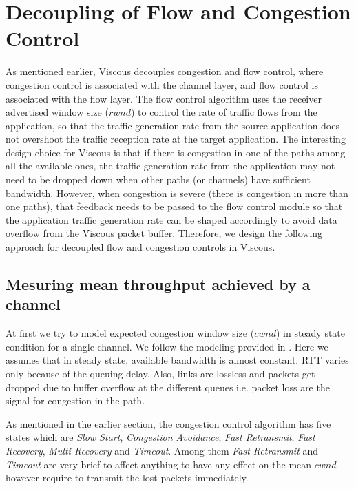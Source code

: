 \section{Decoupling of Flow and Congestion Control}
As mentioned earlier, Viscous decouples congestion and flow control, where congestion control is associated with the channel layer, and flow control is associated with the flow layer. The flow control algorithm uses the receiver advertised window size ($rwnd$) to control the rate of traffic flows from the application, so that the traffic generation rate from the source application does not overshoot the traffic reception rate at the target application. The interesting design choice for Viscous is that if there is congestion in one of the paths among all the available ones, the traffic generation rate from the application may not need to be dropped down when other paths (or channels) have sufficient bandwidth. However, when congestion is severe (there is congestion in more than one paths), that feedback needs to be passed to the flow control module so that the application traffic generation rate can be shaped accordingly to avoid data overflow from the Viscous packet buffer. Therefore, we design the following approach for decoupled flow and congestion controls in Viscous. 

\subsection{Mesuring mean throughput achieved by a channel}
At first we try to model expected congestion window size ($cwnd$) in steady state condition for a single channel. We  follow the modeling provided in \cite{Padhye2000}. Here we assumes that in steady state, available bandwidth is almost constant. RTT varies only because of the queuing delay. Also, links are lossless and packets get dropped due to buffer overflow at the different queues i.e. packet loss are the signal for congestion in the path.

As mentioned in the earlier section, the congestion control algorithm has five states which are {\it Slow Start}, {\it Congestion Avoidance}, {\it Fast Retransmit}, {\it Fast Recovery}, {\it Multi Recovery} and {\it Timeout}. Among them {\it Fast Retransmit} and {\it Timeout} are very brief to affect anything to have any effect on the mean $cwnd$ however require to transmit the lost packets immediately.

